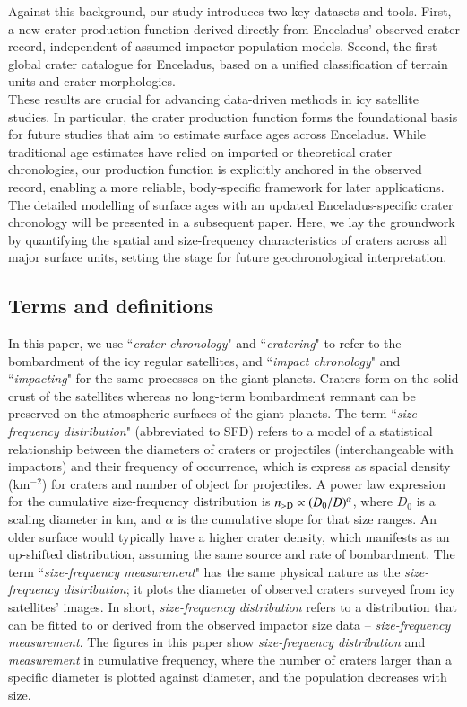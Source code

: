 \documentclass[preprint,12pt,3p,times,authoryear]{elsarticle}
\begin{document}
Against this background, our study introduces two key datasets and tools. First, a new crater production function derived directly from Enceladus’ observed crater record, independent of assumed impactor population models. Second, the first global crater catalogue for Enceladus, based on a unified classification of terrain units and crater morphologies. \\

These results are crucial for advancing data-driven methods in icy satellite studies. In particular, the crater production function forms the foundational basis for future studies that aim to estimate surface ages across Enceladus. While traditional age estimates have relied on imported or theoretical crater chronologies, our production function is explicitly anchored in the observed record, enabling a more reliable, body-specific framework for later applications. \\

The detailed modelling of surface ages with an updated Enceladus-specific crater chronology will be presented in a subsequent paper. Here, we lay the groundwork by quantifying the spatial and size-frequency characteristics of craters across all major surface units, setting the stage for future geochronological interpretation.

\subsection{Terms and definitions}
\label{term&def}
In this paper, we use ``{\it crater chronology}" and ``{\it cratering}" to refer to the bombardment of the icy regular satellites, and ``{\it impact chronology}" and ``{\it impacting}" for the same processes on the giant planets. Craters form on the solid crust of the satellites whereas no long-term bombardment remnant can be preserved on the atmospheric surfaces of the giant planets. The term
``{\it size-frequency distribution}" (abbreviated to SFD) refers to a model of a statistical relationship between the diameters of craters or projectiles (interchangeable with impactors) and their frequency of occurrence, which is express as spacial density (km$^{-2}$) for craters and number of object for projectiles. A power law expression for the cumulative size-frequency distribution is $n_{\rm >D} \propto (D_0/D)^\alpha$, %
where $D_0$ is a scaling diameter in km, and $\alpha$ is the cumulative slope for that size ranges.
An older surface would typically have a higher crater density, which manifests as an up-shifted distribution, assuming the same source and rate of bombardment. The term ``{\it size-frequency measurement}" has the same physical nature as the {\it size-frequency distribution}; it plots the diameter of observed craters surveyed from icy satellites' images. In short, {\it size-frequency distribution} refers to a distribution that can be fitted to or derived from the observed impactor size data -- {\it size-frequency measurement}. The figures in this paper show {\it size-frequency distribution} and {\it measurement} in cumulative frequency, where the number of craters larger than a specific diameter is plotted against diameter, and the population decreases with size. \\
\end{document}
